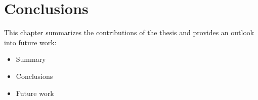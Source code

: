 \chapter{Conclusions}
\label{cha:conclusions}

This chapter summarizes the contributions of the thesis and provides an outlook into future work:

\begin{itemize}
    \item Summary
    \item Conclusions 
    \item Future work
\end{itemize}
